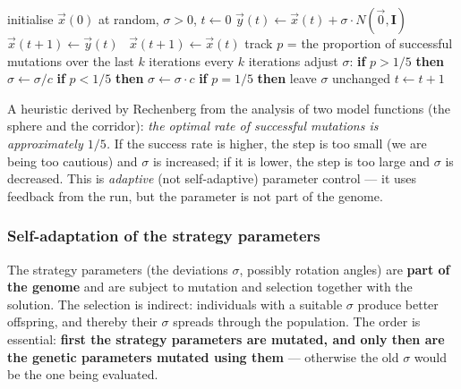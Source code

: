 \documentclass[11pt,a4paper]{article}
\theoremstyle{definition}
\begin{document}
\begin{algorithm}[!ht]
\caption{$(1+1)$-ES with the 1/5 rule (minimisation of $f:\mathbb{R}^n \to \mathbb{R}$)}
\begin{algorithmic}[1]
\State initialise $\vec x(0)$ at random, $\sigma > 0$, $t \gets 0$
\Repeat
  \State $\vec y(t) \gets \vec x(t) + \sigma \cdot N(\vec 0, \mathbf{I})$
   $\vec x(t+1) \gets \vec y(t)$
  \Else\ $\vec x(t+1) \gets \vec x(t)$
  \EndIf
  \State track $p$ = the proportion of successful mutations over the last $k$ iterations
  \State every $k$ iterations adjust $\sigma$:
  \State \quad \textbf{if} $p > 1/5$ \textbf{then} $\sigma \gets \sigma / c$
  \State \quad \textbf{if} $p < 1/5$ \textbf{then} $\sigma \gets \sigma \cdot c$
  \State \quad \textbf{if} $p = 1/5$ \textbf{then} leave $\sigma$ unchanged
  \State $t \gets t+1$
\end{algorithmic}
\end{algorithm}

\begin{defbox}
A heuristic derived by Rechenberg from the analysis of two model functions (the
sphere and the corridor): \emph{the optimal rate of successful mutations is
approximately $1/5$.} If the success rate is higher, the step is too small (we
are being too cautious) and $\sigma$ is increased; if it is lower, the step is
too large and $\sigma$ is decreased. This is \emph{adaptive} (not
self-adaptive) parameter control --- it uses feedback from the run, but the
parameter is not part of the genome.
\end{defbox}

\subsubsection{Self-adaptation of the strategy parameters}

\begin{defbox}
The strategy parameters (the deviations $\sigma$, possibly rotation angles) are
\textbf{part of the genome} and are subject to mutation and selection together
with the solution. The selection is indirect: individuals with a suitable
$\sigma$ produce better offspring, and thereby their $\sigma$ spreads through
the population. The order is essential: \textbf{first the strategy parameters
are mutated, and only then are the genetic parameters mutated using them} ---
otherwise the old $\sigma$ would be the one being evaluated.
\end{defbox}
\end{document}

